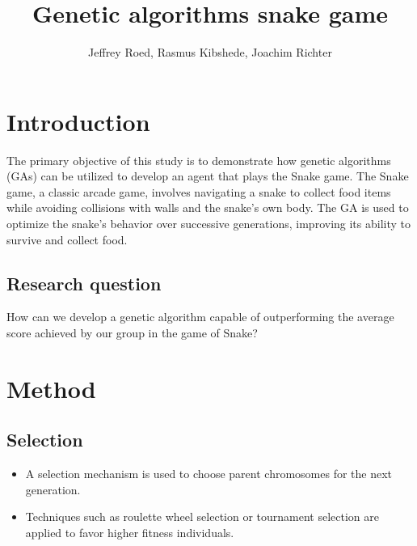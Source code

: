 \documentclass[a4paper, twocolumn]{article}
\author{Jeffrey Roed, Rasmus Kibshede, Joachim Richter}
\title{Genetic algorithms snake game}
\begin{document}
 
 
 
\section{Introduction\label{sec:Introduction}}
 
The primary objective of this study is to demonstrate how genetic algorithms (GAs) can be utilized to develop an agent that plays the Snake game. The Snake game, a classic arcade game, involves navigating a snake to collect food items while avoiding collisions with walls and the snake's own body. The GA is used to optimize the snake's behavior over successive generations, improving its ability to survive and collect food.
 
\subsection{Research question\label{sec:Research Question}}
 
How can we develop a genetic algorithm capable of outperforming the average score achieved by our group in the game of Snake?
 
 
\section{Method\label{sec:Method}}
 
\subsection{Selection\label{sec:Selection}}
 
\begin{itemize}
    \item A selection mechanism is used to choose parent chromosomes for the next generation.
    \item Techniques such as roulette wheel selection or tournament selection are applied to favor higher fitness individuals.
\end{itemize}
 
\end{document}
